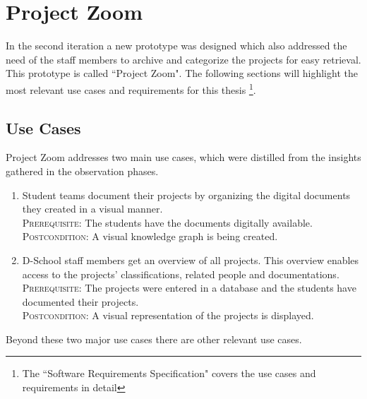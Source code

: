 \section{Project Zoom}
In the second iteration a new prototype was designed which also addressed the need of the staff members to archive and categorize the projects for easy retrieval. This prototype is called ``Project Zoom". The following sections will highlight the most relevant use cases and requirements for this thesis \footnote{The ``Software Requirements Specification"\cite{ReqSpec} covers the use cases and requirements in detail}.

\subsection{Use Cases}
Project Zoom addresses two main use cases, which were distilled from the insights gathered in the observation phases.

\begin{enumerate}
\item Student teams document their projects by organizing the digital documents they created in a visual manner.\\
\textsc{Prerequisite}: The students have the documents digitally available.\\
\textsc{Postcondition}: A visual knowledge graph is being created. \label{uc:1}

\item D-School staff members get an overview of all projects. This overview enables access to the projects' classifications, related people and documentations.\\
\textsc{Prerequisite}: The projects were entered in a database and the students have documented their projects.\\
\textsc{Postcondition}: A visual representation of the projects is displayed. \label{uc:2}
\end{enumerate}

Beyond these two major use cases there are other relevant use cases.

